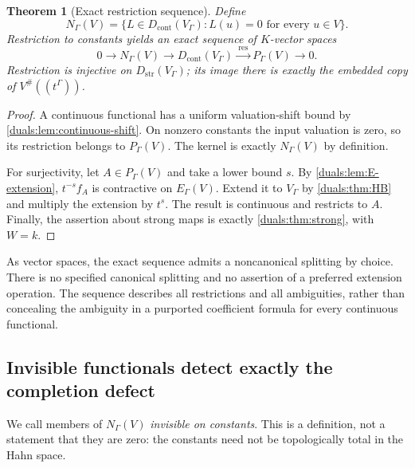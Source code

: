 \documentclass[11pt,letterpaper]{article}
\numberwithin{equation}{section}
\newtheorem{theorem}{Theorem}[section]
\theoremstyle{definition}
\theoremstyle{remark}
\newcommand{\res}{\operatorname{res}}
\newcommand{\Dstr}{D_{\mathrm{str}}}
\newcommand{\Dcont}{D_{\mathrm{cont}}}
\begin{document}
\begin{theorem}[Exact restriction sequence]\label{duals:thm:restriction}
Define
\[
 N_\Gamma(V)=\{L\in\Dcont(V_\Gamma):L(u)=0\text{ for every }u\in V\}.
\]
Restriction to constants yields an exact sequence of $K$-vector spaces
\begin{equation}\label{duals:eq:exact-sequence}
 0\longrightarrow N_\Gamma(V)\longrightarrow\Dcont(V_\Gamma)
 \xrightarrow{\ \res\ }P_\Gamma(V)\longrightarrow0.
\end{equation}
Restriction is injective on $\Dstr(V_\Gamma)$; its image there is
exactly the embedded copy of $V^\#((t^\Gamma))$.
\end{theorem}
\begin{proof}
A continuous functional has a uniform valuation-shift bound by
\cref{duals:lem:continuous-shift}. On nonzero constants the input valuation
is zero, so its restriction belongs to $P_\Gamma(V)$. The kernel is
exactly $N_\Gamma(V)$ by definition.

For surjectivity, let $A\in P_\Gamma(V)$ and take a lower bound $s$.
By \cref{duals:lem:E-extension}, $t^{-s}f_A$ is contractive on
$E_\Gamma(V)$. Extend it to $V_\Gamma$ by \cref{duals:thm:HB} and multiply
the extension by $t^s$. The result is continuous and restricts to $A$.
Finally, the assertion about strong maps is exactly
\cref{duals:thm:strong}, with $W=k$.
\end{proof}

As vector spaces, the exact sequence admits a noncanonical splitting
by choice. There is no specified canonical splitting and no assertion
of a preferred extension operation. The sequence describes all
restrictions and all ambiguities, rather than concealing the ambiguity
in a purported coefficient formula for every continuous functional.

\subsection{Invisible functionals detect exactly the completion defect}
We call members of $N_\Gamma(V)$ \emph{invisible on constants}.
This is a definition, not a statement that they are zero: the constants
need not be topologically total in the Hahn space.
\end{document}

